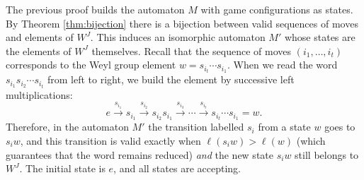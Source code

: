 \documentclass[11pt,a4paper]{amsart}
\theoremstyle{plain}
\theoremstyle{definition}
\theoremstyle{remark}
\begin{document}
The previous proof builds the automaton $M$ with game configurations as states. By Theorem \ref{thm:bijection} there is a bijection between valid sequences of moves and elements of $W^J$. This induces an isomorphic automaton $M'$ whose states are the elements of $W^J$ themselves. Recall that the sequence of moves $(i_1, \dots, i_t)$ corresponds to the Weyl group element $w = s_{i_t} \cdots s_{i_1}$. When we read the word $s_{i_1} s_{i_2} \cdots s_{i_t}$ from left to right, we build the element by successive left multiplications:
\[
e \xrightarrow{s_{i_1}} s_{i_1} \xrightarrow{s_{i_2}} s_{i_2}s_{i_1} \xrightarrow{s_{i_3}} \cdots \xrightarrow{s_{i_t}} s_{i_t}\cdots s_{i_1} = w .
\]
Therefore, in the automaton $M'$ the transition labelled $s_i$ from a state $w$ goes to $s_i w$, and this transition is valid exactly when $\ell(s_i w) > \ell(w)$ (which guarantees that the word remains reduced) \emph{and} the new state $s_i w$ still belongs to $W^J$. The initial state is $e$, and all states are accepting.
\end{document}
